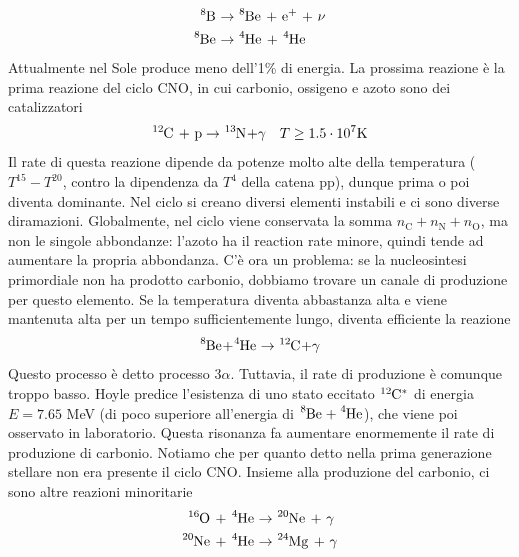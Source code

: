 \documentclass[a4paper,11pt]{article}
\theoremstyle{theorem}
\theoremstyle{definition}
\begin{document}
\begin{itemize}
\begin{align*}
		\tensor[^8]{\mathrm{B}}{}&\rightarrow\tensor[^8]{\mathrm{Be}}{}\textrm{ + e$^+$ + $\nu$}\\
		\tensor[^8]{\mathrm{Be}}{}&\rightarrow\tensor[^4]{\mathrm{He}}{}\textrm{ + }\tensor[^4]{\mathrm{He}}{}
		\end{align*}
		Attualmente nel Sole produce meno dell'1\% di energia. La prossima reazione è la prima reazione del ciclo CNO, in cui carbonio, ossigeno e azoto sono dei catalizzatori
		\begin{align*}
			\tensor[^{12}]{\mathrm{C}}{}\textrm{ + p}&\rightarrow\tensor[^{13}]{\mathrm{N}}{}\mathrm{ + }\gamma&T\geq 1.5\cdot10^7\mathrm{ K}\\
		\end{align*}	
		Il rate di questa reazione dipende da potenze molto alte della temperatura ($T^{15}-T^{20}$, contro la dipendenza da $T^4$ della catena pp), dunque prima o poi diventa dominante. Nel ciclo si creano diversi elementi instabili e ci sono diverse diramazioni. Globalmente, nel ciclo viene conservata la somma $n_\mathrm{C}+n_\mathrm{N}+n_\mathrm{O}$, ma non le singole abbondanze: l'azoto ha il reaction rate minore, quindi tende ad aumentare la propria abbondanza. C'è ora un problema: se la nucleosintesi primordiale non ha prodotto carbonio, dobbiamo trovare un canale di produzione per questo elemento. Se la temperatura diventa abbastanza alta e viene mantenuta alta per un tempo sufficientemente lungo, diventa efficiente la reazione
		\begin{align*}
			\tensor[^{8}]{\mathrm{Be}}{}\mathrm{ + }\tensor[^{4}]{\mathrm{He}}{}\rightarrow\tensor[^{12}]{\mathrm{C}}{}\mathrm{ + }\gamma
		\end{align*}
		Questo processo è detto processo 3$\alpha$. Tuttavia, il rate di produzione è comunque troppo basso. Hoyle predice l'esistenza di uno stato eccitato $\tensor[^{12}]{\mathrm{C}}{^*}$ di energia $E=7.65$ MeV (di poco superiore all'energia di $\tensor[^{8}]{\mathrm{Be}}{}+\tensor[^{4}]{\mathrm{He}}{}$), che viene poi osservato in laboratorio. Questa risonanza fa aumentare enormemente il rate di produzione di carbonio. Notiamo che per quanto detto nella prima generazione stellare non era presente il ciclo CNO. Insieme alla produzione del carbonio, ci sono altre reazioni minoritarie
		\begin{align*}
			\tensor[^{16}]{\mathrm{O}}{}\textrm{ + }\tensor[^{4}]{\mathrm{He}}{}&\rightarrow \tensor[^{20}]{\mathrm{Ne}}{}\textrm{ + }\gamma\\
			\tensor[^{20}]{\mathrm{Ne}}{}\textrm{ + }\tensor[^{4}]{\mathrm{He}}{}&\rightarrow\tensor[^{24}]{\mathrm{Mg}}{}\textrm{ + }\gamma

\end{align*}
\end{itemize}
\end{document}
